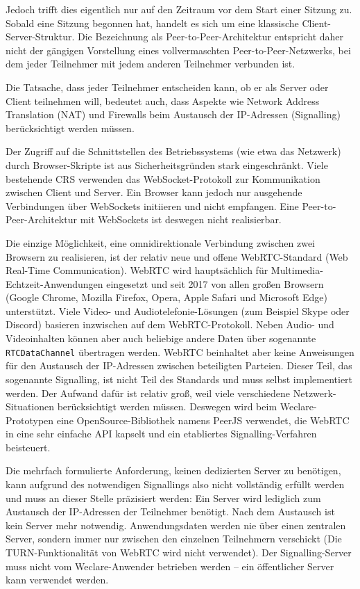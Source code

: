 Jedoch trifft dies eigentlich nur auf den Zeitraum vor dem Start einer Sitzung zu. Sobald eine Sitzung begonnen hat, handelt es sich um eine klassische Client-Server-Struktur. Die Bezeichnung als Peer-to-Peer-Architektur entspricht daher nicht der gängigen Vorstellung eines vollvermaschten Peer-to-Peer-Netzwerks, bei dem jeder Teilnehmer mit jedem anderen Teilnehmer verbunden ist.

Die Tatsache, dass jeder Teilnehmer entscheiden kann, ob er als Server oder Client teilnehmen will, bedeutet auch, dass Aspekte wie Network Address Translation (NAT) und Firewalls beim Austausch der IP-Adressen (Signalling) berücksichtigt werden müssen.

Der Zugriff auf die Schnittstellen des Betriebssystems (wie etwa das Netzwerk) durch Browser-Skripte ist aus Sicherheitsgründen stark eingeschränkt. Viele bestehende CRS verwenden das WebSocket-Protokoll zur Kommunikation zwischen Client und Server. Ein Browser kann jedoch nur ausgehende Verbindungen über WebSockets initiieren und nicht empfangen. Eine Peer-to-Peer-Architektur mit WebSockets ist deswegen nicht realisierbar.

Die einzige Möglichkeit, eine omnidirektionale Verbindung zwischen zwei Browsern zu realisieren, ist der relativ neue und offene WebRTC-Standard (Web Real-Time Communication)\cite{web:webrtc}. WebRTC wird hauptsächlich für Multimedia-Echtzeit-Anwendungen eingesetzt und seit 2017 von allen großen Browsern (Google Chrome, Mozilla Firefox, Opera, Apple Safari und Microsoft Edge) unterstützt. Viele Video- und Audiotelefonie-Lösungen (zum Beispiel Skype oder Discord) basieren inzwischen auf dem WebRTC-Protokoll. Neben Audio- und Videoinhalten können aber auch beliebige andere Daten über sogenannte \texttt{RTCDataChannel} übertragen werden. WebRTC beinhaltet aber keine Anweisungen für den Austausch der IP-Adressen zwischen beteiligten Parteien. Dieser Teil, das sogenannte Signalling, ist nicht Teil des Standards und muss selbst implementiert werden. Der Aufwand dafür ist relativ groß, weil viele verschiedene Netzwerk-Situationen berücksichtigt werden müssen. Deswegen wird beim Weclare-Prototypen eine OpenSource-Bibliothek namens PeerJS\cite{web:peerjs} verwendet, die WebRTC in eine sehr einfache API kapselt und ein etabliertes Signalling-Verfahren beisteuert.

Die mehrfach formulierte Anforderung, keinen dedizierten Server zu benötigen, kann aufgrund des notwendigen Signallings also nicht vollständig erfüllt werden und muss an dieser Stelle präzisiert werden: Ein Server wird lediglich zum Austausch der IP-Adressen der Teilnehmer benötigt. Nach dem Austausch ist kein Server mehr notwendig. Anwendungsdaten werden nie über einen zentralen Server, sondern immer nur zwischen den einzelnen Teilnehmern verschickt (Die TURN-Funktionalität von WebRTC wird nicht verwendet). Der Signalling-Server muss nicht vom Weclare-Anwender betrieben werden – ein öffentlicher Server kann verwendet werden.

